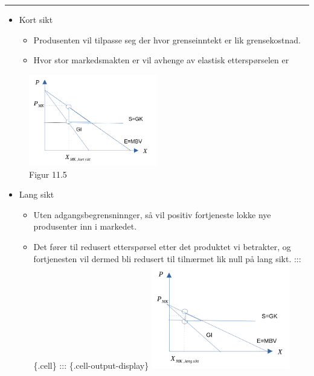 \documentclass[
  letterpaper,
  DIV=11,
  numbers=noendperiod]{scrartcl}
\providecommand{\tightlist}{%
  \setlength{\itemsep}{0pt}\setlength{\parskip}{0pt}}\usepackage{longtable,booktabs,array}
\begin{document}
\begin{center}\rule{0.5\linewidth}{0.5pt}\end{center}

\begin{itemize}
\tightlist
\item
  Kort sikt

  \begin{itemize}
  \tightlist
  \item
    Produsenten vil tilpasse seg der hvor grenseinntekt er lik
    grensekostnad.
  \item
    Hvor stor markedsmakten er vil avhenge av elastisk etterspørselen er
  \end{itemize}
\end{itemize}

\begin{figure}[H]

{\centering \includegraphics[width=0.5\textwidth,height=\textheight]{drawio/monk_ks.png}

}

\caption{Figur 11.5}

\end{figure}%

\begin{itemize}
\tightlist
\item
  Lang sikt

  \begin{itemize}
  \tightlist
  \item
    Uten adgangsbegrensninnger, så vil positiv fortjeneste lokke nye
    produsenter inn i markedet.
  \item
    Det fører til redusert etterspørsel etter det produktet vi
    betrakter, og fortjenesten vil dermed bli redusert til tilnærmet lik
    null på lang sikt. ::: \{.cell\} ::: \{.cell-output-display\}
    \includegraphics[width=0.5\textwidth,height=\textheight]{drawio/monk_ls.png}
  \end{itemize}
\end{itemize}
\end{document}
